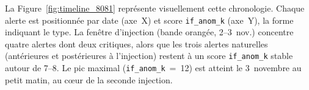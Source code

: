 La Figure~\ref{fig:timeline_8081} représente visuellement cette chronologie. Chaque
alerte est positionnée par date (axe~X) et score \texttt{if\_anom\_k} (axe~Y), la
forme indiquant le type. La fenêtre d'injection (bande orangée, 2--3~nov.) concentre
quatre alertes dont deux critiques, alors que les trois alertes naturelles
(antérieures et postérieures à l'injection) restent à un score \texttt{if\_anom\_k}
stable autour de 7--8. Le pic maximal (\texttt{if\_anom\_k}~=~12) est atteint le
3~novembre au petit matin, au cœur de la seconde injection.

\begin{figure}[H]
    \centering
\end{figure}
